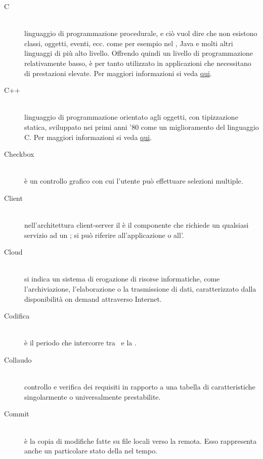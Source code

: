 \documentclass[12pt,a4paper]{article}
\begin{document}
\begin{description}
\item[C]
\hfill\\ linguaggio di programmazione procedurale, e ciò vuol dire che non esistono classi, oggetti, eventi, ecc. come per esempio nel , Java e molti altri linguaggi di più alto livello. Offrendo quindi un livello di programmazione relativamente basso, è per tanto utilizzato in applicazioni che necessitano di prestazioni elevate. Per maggiori informazioni si veda \href{https://it.wikiversity.org/wiki/Linguaggio_C}{qui}.

\item[C++]
\hfill\\ linguaggio di programmazione orientato agli oggetti, con tipizzazione statica, sviluppato nei primi anni '80 come un miglioramento del linguaggio C. Per maggiori informazioni si veda \href{https://it.wikiversity.org/wiki/C\%2B\%2B}{qui}.

\item[Checkbox]
\hfill\\ è un controllo grafico con cui l'utente può effettuare selezioni multiple.

\item[Client]
\hfill\\nell'architettura client-server il  è il componente che richiede un qualsiasi servizio ad un ; si può riferire all'applicazione o all'.

\item[Cloud]
\hfill\\ si indica un sistema di erogazione di risorse informatiche, come l'archiviazione, l'elaborazione o la trasmissione di dati, caratterizzato dalla disponibilità on demand attraverso Internet.

\item[Codifica] 
\hfill\\ è il periodo che intercorre tra \RP\ e la \RQ.

\item[Collaudo] 
\hfill\\ controllo e verifica dei requisiti in rapporto a una tabella di caratteristiche singolarmente o universalmente prestabilite.

\item[Commit] 
\hfill\\ è la copia di modifiche fatte su file locali verso la  remota. Esso rappresenta anche un particolare stato della  nel tempo.


\end{description}
\end{document}
